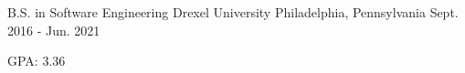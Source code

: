 

\begin{cventries}

  \cventry
    {B.S. in Software Engineering} %
    {Drexel University} %
    {Philadelphia, Pennsylvania} %
    {Sept. 2016 - Jun. 2021} %
    {
      \begin{cvitems} %
        \item GPA: 3.36
      \end{cvitems}
    }

\end{cventries}
